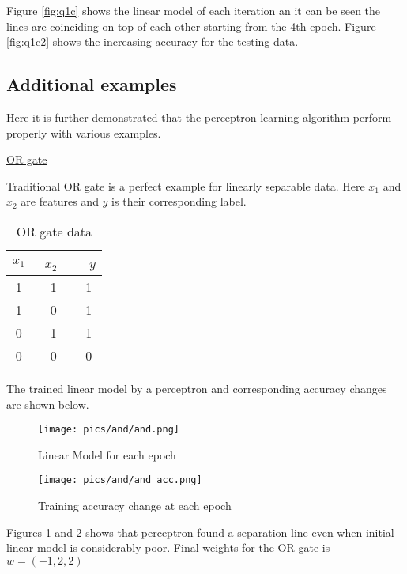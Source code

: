 \documentclass[11pt]{article}
\begin{document}
Figure \ref{fig:q1c} shows the linear model of each iteration an it can be seen the lines are coinciding on top of each other starting from the 4th epoch. Figure \ref{fig:q1c2} shows the increasing accuracy for the testing data.


\subsection*{Additional examples}

Here it is further demonstrated that the perceptron learning algorithm perform properly with various examples. \bigskip

\underline{OR gate} \medskip

Traditional OR gate is a perfect example for linearly separable data. Here $x_1$ and $x_2$ are features and $y$ is their corresponding label.
\bgroup
\def\arraystretch{1.5}%
\begin{table}[H]
\centering
\caption{OR gate data}
\begin{tabular}{|c|c|c|}
\hline
$x_1$   & \ $x_2$ \  & \ $y$  \\ \hline
1 & 1 & 1 \\ \hline
1 & 0 & 1\\ \hline
0 & 1 & 1 \\ \hline
0 & 0 & 0 \\ \hline
\end{tabular}
\label{table:or}
\end{table}
\egroup

The trained linear model by a perceptron and corresponding accuracy changes are shown below.

\begin{multicols}{2}

\begin{figure}[H]
\centering
\texttt{[image: pics/and/and.png]}
\captionsetup{justification=centering}
\caption{Linear Model for each epoch}
\label{fig:or}
\end{figure}

\begin{figure}[H]
\centering
\texttt{[image: pics/and/and\_acc.png]}
\captionsetup{justification=centering}
\caption{Training accuracy change at each epoch}
\label{fig:or_acc}
\end{figure}

\end{multicols}

Figures \ref{fig:or} and \ref{fig:or_acc} shows that perceptron found a separation line even when initial linear model is considerably poor. Final weights for the OR gate is $w=(-1, 2 ,2)$ \bigskip
\end{document}
